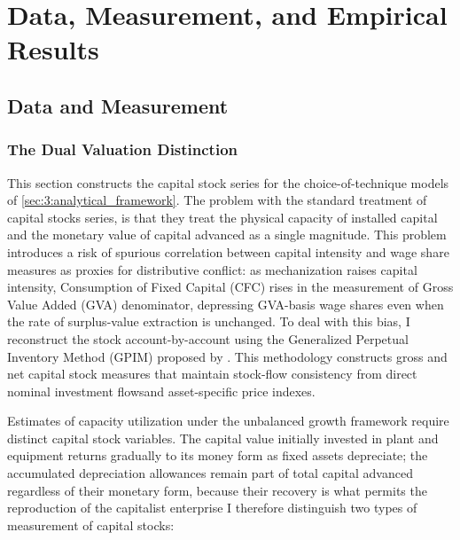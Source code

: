 \section{Data, Measurement, and Empirical Results}
\subsection{Data and Measurement}
\label{sec:41:data_measurement}

\subsubsection{The Dual Valuation Distinction}
\label{sec:411:dual_valuation}

This section constructs the capital stock series for the
choice-of-technique models of \cref{sec:3:analytical_framework}.
The problem with the standard treatment of capital stocks series, is that they treat the physical capacity of installed capital and the monetary value of capital advanced as a single magnitude. This problem introduces a risk of spurious correlation between capital intensity and wage share measures as proxies for distributive conflict: as mechanization raises capital intensity, Consumption of Fixed Capital (CFC) rises in the measurement of Gross Value Added (GVA)  
denominator, depressing GVA-basis wage shares even when the rate of
surplus-value extraction is unchanged. To deal with this bias, I
reconstruct the stock account-by-account using the Generalized
Perpetual Inventory Method (GPIM) proposed by  \citet[App.~6.5]{Shaikh2016}. This methodology constructs gross and net capital stock measures that maintain stock-flow consistency from direct nominal investment flowsand asset-specific price indexes.

Estimates of capacity utilization under the unbalanced growth framework require distinct capital stock variables. The capital value initially invested in plant and equipment returns gradually to its money form as fixed assets depreciate; the accumulated depreciation allowances remain part of total capital advanced regardless of their monetary form, because their recovery is what permits the reproduction of the capitalist enterprise I therefore distinguish two types of measurement of capital stocks:

